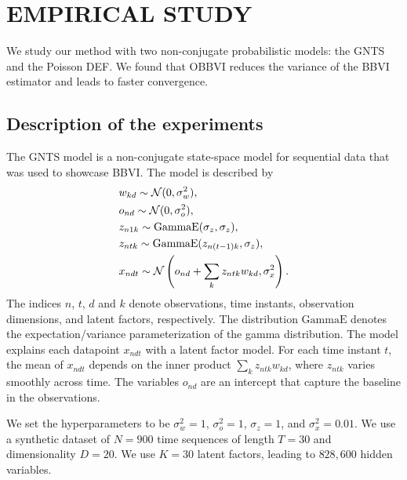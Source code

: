 \section{EMPIRICAL STUDY}
\label{sec:experiments}
\glsresetall{}

We study our method with two non-conjugate probabilistic models: the
\gls{GNTS} and the Poisson \gls{DEF}. We found that \gls{OBBVI}
reduces the variance of the \gls{BBVI} estimator and leads to faster
convergence.

\vspace*{-5pt}
\subsection{Description of the experiments}
\label{sec:descr_experiments}
\vspace*{-5pt}

The \gls{GNTS} model \citep{Ranganath2014} is a non-conjugate
state-space model for sequential data that was used to showcase
\gls{BBVI}. The model is described by
\begin{equation}
  \begin{split}
    & w_{kd}\sim \mathcal{N}(0,\sigma_w^2),\\
    & o_{nd}\sim \mathcal{N}(0,\sigma_o^2),\\
    & z_{n1k}\sim \textrm{GammaE}(\sigma_z,\sigma_z),\\
    & z_{ntk}\sim \textrm{GammaE}(z_{n(t-1)k},\sigma_z),\\
    & x_{ndt}\sim \mathcal{N}\left(o_{nd}+\sum_k z_{ntk}w_{kd},\sigma_x^2\right).
  \end{split}
\end{equation}
The indices $n$, $t$, $d$ and $k$ denote observations, time instants,
observation dimensions, and latent factors, respectively. The
distribution $\textrm{GammaE}$ denotes the expectation/variance
parameterization of the gamma distribution.
%
The model explains each datapoint $x_{ndt}$ with a latent factor
model. For each time instant $t$, the mean of $x_{ndt}$ depends on the
inner product $\sum_k z_{ntk}w_{kd}$, where $z_{ntk}$ varies smoothly
across time. The variables $o_{nd}$ are an intercept that capture the
baseline in the observations.

We set the hyperparameters to be
$\sigma_w^2=1$, $\sigma_o^2=1$, $\sigma_z=1$, and $\sigma^2_x=0.01$.
We use a synthetic dataset of $N=900$ time sequences of length $T=30$
and dimensionality $D=20$. We use $K=30$ latent factors, leading to
$828,600$ hidden variables.

